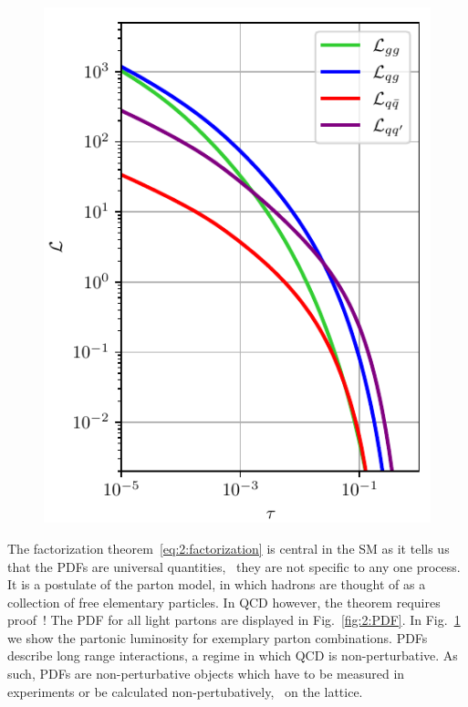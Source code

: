 \begin{figure}[ht]
\begin{minipage}[t]{0.48\textwidth}
\centering
\includegraphics[width=\textwidth]{Images/luminosity.pdf}
\label{fig:2:luminosity}
\end{minipage}
\end{figure}

The factorization theorem~\eqref{eq:2:factorization} is central in the \acs{SM} as it tells us that the \acs{PDF}s are universal quantities, \ie\ they are not specific to any one process. It is a postulate of the parton model, in which hadrons are thought of as a collection of free elementary particles. In \acs{QCD} however, the theorem requires proof~\cite{Collins:1989gx}!
The \acs{PDF} for all light partons are displayed in Fig.~\ref{fig:2:PDF}. In Fig.~\ref{fig:2:luminosity} we show the partonic luminosity for exemplary parton combinations. \acs{PDF}s describe long range interactions, a regime in which \acs{QCD} is non-perturbative. As such, \acs{PDF}s are non-perturbative objects which have to be measured in experiments or be calculated non-pertubatively, \eg\ on the lattice.

